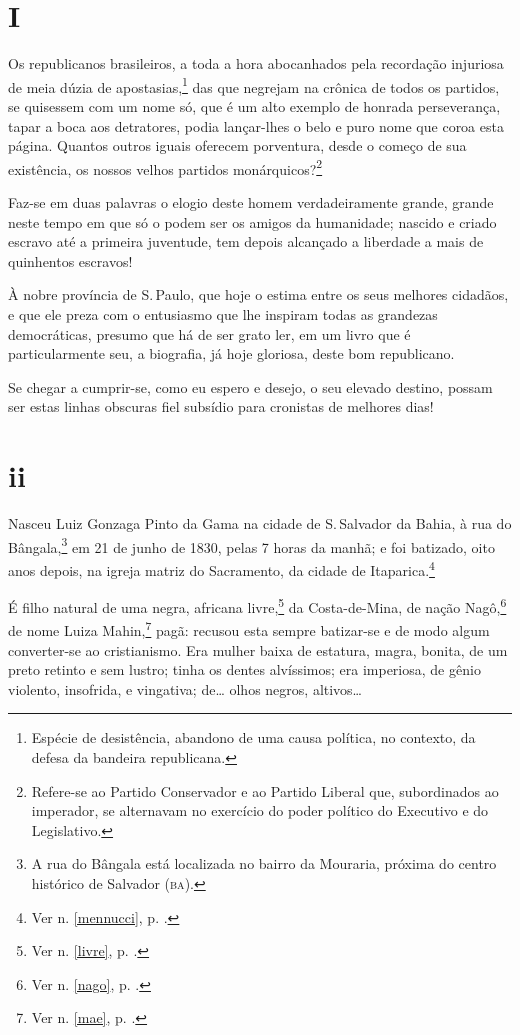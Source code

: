 \section*{I}

\noindent{}Os republicanos brasileiros, a toda a hora abocanhados pela recordação
injuriosa de meia dúzia de apostasias,\footnote{Espécie de desistência,
  abandono de uma causa política, no contexto, da defesa da bandeira
  republicana.} das que negrejam na crônica de todos os partidos, se
quisessem com um nome só, que é um alto exemplo de honrada perseverança,
tapar a boca aos detratores, podia lançar-lhes o belo e puro nome que
coroa esta página. Quantos outros iguais oferecem porventura, desde o
começo de sua existência, os nossos velhos partidos
monárquicos?\footnote{Refere-se ao Partido Conservador e ao Partido
  Liberal que, subordinados ao imperador, se alternavam no exercício do
  poder político do Executivo e do Legislativo.}

Faz-se em duas palavras o elogio deste homem verdadeiramente grande,
grande neste tempo em que só o podem ser os amigos da humanidade;
nascido e criado escravo até a primeira juventude, tem depois alcançado
a liberdade a mais de quinhentos escravos!

À nobre província de S.\,Paulo, que hoje o estima entre os seus melhores
cidadãos, e que ele preza com o entusiasmo que lhe inspiram todas as
grandezas democráticas, presumo que há de ser grato ler, em um livro que
é particularmente seu, a biografia, já hoje gloriosa, deste bom
republicano.

Se chegar a cumprir-se, como eu espero e desejo, o seu elevado destino,
possam ser estas linhas obscuras fiel subsídio para cronistas de
melhores dias!

\section*{ii}

Nasceu Luiz Gonzaga Pinto da Gama na cidade de S.\,Salvador da Bahia, à
rua do Bângala,\footnote{A rua do Bângala está localizada no bairro da
  Mouraria, próxima do centro histórico de Salvador (\textsc{ba}).} em 21 de
junho de 1830, pelas 7 horas da manhã; e foi batizado, oito anos depois,
na igreja matriz do Sacramento, da cidade de Itaparica.\footnote{Ver n. \ref{mennucci}, p. \pageref{mennucci}.}

É filho natural de uma negra, africana livre,\footnote{Ver n. \ref{livre}, p. \pageref{livre}.} da Costa-de-Mina, de nação
Nagô,\footnote{Ver n. \ref{nago}, p. \pageref{nago}.} de
nome Luiza Mahin,\footnote{Ver n. \ref{mae}, p. \pageref{mae}.} pagã: recusou esta sempre
batizar-se e de modo algum converter-se ao cristianismo. Era mulher
baixa de estatura, magra, bonita, de um preto retinto e sem lustro;
tinha os dentes alvíssimos; era imperiosa, de gênio violento, insofrida,
e vingativa; de\ldots{} olhos negros, altivos\ldots{}

